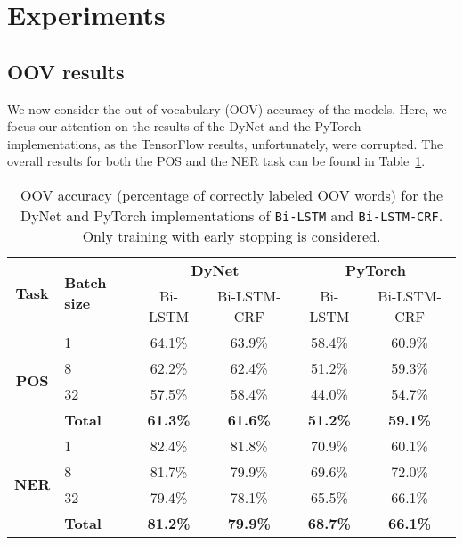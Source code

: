 
\section{Experiments}\label{sec:experiments}




\subsection{OOV results}

We now consider the out-of-vocabulary (OOV) accuracy of the models. Here, we
focus our attention on the results of the DyNet and the PyTorch implementations,
as the TensorFlow results, unfortunately, were corrupted. The overall results
for both the POS and the NER task can be found in
Table~\ref{table:oov-accuracy-total}.

\begin{table}[h!]
    \centering
    \begin{tabular}{c l c c|c c}
     \toprule
       \multirow{2}{*}{\bfseries Task}
     & \multirow{2}{*}{\bfseries Batch size}
     & \multicolumn{2}{c}{\bfseries DyNet}
     & \multicolumn{2}{c}{\bfseries PyTorch} \\

      \cmidrule(lr){3-6}
     && Bi-LSTM  & Bi-LSTM-CRF & Bi-LSTM  & Bi-LSTM-CRF \\ 

      \cmidrule(lr){1-6}
      \multirow{4}{*}{\textbf{POS}}
      &  1 & 64.1\% & 63.9\%  & 58.4\% & 60.9\%  \\
      &  8 & 62.2\% & 62.4\%  & 51.2\% & 59.3\%  \\
      & 32 & 57.5\% & 58.4\%  & 44.0\% & 54.7\%  \\ \cmidrule(lr){2-6}
      & \textbf{Total} &
      \textbf{61.3\%} & \textbf{61.6\%}  & \textbf{51.2\%} & \textbf{59.1\%} \\

      \cmidrule(lr){1-6}
      \multirow{4}{*}{\textbf{NER}}
     &  1 & 82.4\% & 81.8\%  & 70.9\% & 60.1\%  \\
     &  8 & 81.7\% & 79.9\%  & 69.6\% & 72.0\%  \\
     & 32 & 79.4\% & 78.1\%  & 65.5\% & 66.1\%  \\ \cmidrule(lr){2-6}
     & \textbf{Total} &
      \textbf{81.2\%} & \textbf{79.9\%}  & \textbf{68.7\%} & \textbf{66.1\%} \\

     \bottomrule
    \end{tabular}
    \caption{OOV accuracy (percentage of correctly labeled OOV words) for the DyNet
        and PyTorch implementations of \texttt{Bi-LSTM} and
        \texttt{Bi-LSTM-CRF}. Only training with early stopping is considered. 
    }\label{table:oov-accuracy-total}
\end{table}

